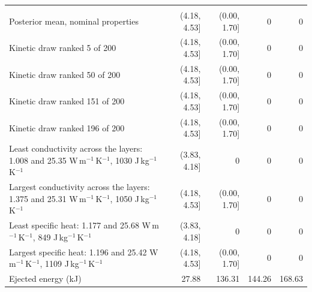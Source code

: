 \begin{table}[!htbp]
\begin{tabular}{>{\raggedright\arraybackslash}p{}rrrr}
\midrule
\multicolumn{5}{l}{\textit{The hottest point's threshold}} \\
Posterior mean, nominal properties & (4.18, 4.53] & (0.00, 1.70] & 0 & 0 \\
\addlinespace[2pt]
Kinetic draw ranked 5 of 200 & (4.18, 4.53] & (0.00, 1.70] & 0 & 0 \\
Kinetic draw ranked 50 of 200 & (4.18, 4.53] & (0.00, 1.70] & 0 & 0 \\
Kinetic draw ranked 151 of 200 & (4.18, 4.53] & (0.00, 1.70] & 0 & 0 \\
Kinetic draw ranked 196 of 200 & (4.18, 4.53] & (0.00, 1.70] & 0 & 0 \\
\addlinespace[2pt]
Least conductivity across the layers: 1.008 and 25.35 W\,m$^{-1}$\,K$^{-1}$, 1030 J\,kg$^{-1}$\,K$^{-1}$ & (3.83, 4.18] & 0 & 0 & 0 \\
Largest conductivity across the layers: 1.375 and 25.31 W\,m$^{-1}$\,K$^{-1}$, 1050 J\,kg$^{-1}$\,K$^{-1}$ & (4.18, 4.53] & (0.00, 1.70] & 0 & 0 \\
Least specific heat: 1.177 and 25.68 W\,m$^{-1}$\,K$^{-1}$, 849 J\,kg$^{-1}$\,K$^{-1}$ & (3.83, 4.18] & 0 & 0 & 0 \\
Largest specific heat: 1.196 and 25.42 W\,m$^{-1}$\,K$^{-1}$, 1109 J\,kg$^{-1}$\,K$^{-1}$ & (4.18, 4.53] & (0.00, 1.70] & 0 & 0 \\
\midrule
Ejected energy (kJ) & 27.88 & 136.31 & 144.26 & 168.63 \\
\bottomrule
\end{tabular}
\end{table}

